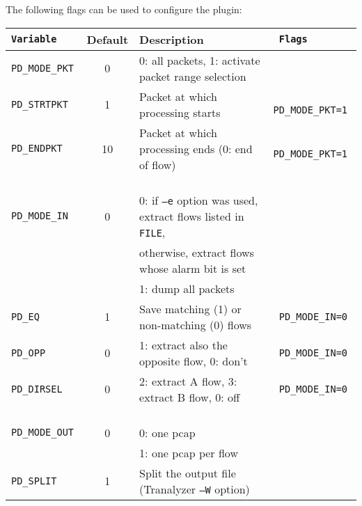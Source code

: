 \documentclass[documentation]{subfiles}
\begin{document}
The following flags can be used to configure the plugin:
\begin{longtable}{>{\tt}lcl>{\tt\small}l}
    \toprule
    {\bf Variable} & {\bf Default} & {\bf Description} & {\bf Flags}\\
    \midrule\endhead%
    PD\_MODE\_PKT & 0                  & 0: all packets, 1: activate packet range selection                               & \\
    PD\_STRTPKT   & 1                  & Packet at which processing starts                                                & PD\_MODE\_PKT=1 \\
    PD\_ENDPKT    & 10                 & Packet at which processing ends (0: end of flow)                                 & PD\_MODE\_PKT=1\\
                  &                    &                                                                                  & \\
    PD\_MODE\_IN  & 0                  & 0: if {\small\tt --e} option was used, extract flows listed in {\small\tt FILE}, & \\
                  &                    & \quad otherwise, extract flows whose alarm bit is set                            & \\
                  &                    & 1: dump all packets                                                              & \\
    PD\_EQ        & 1                  & Save matching (1) or non-matching (0) flows                                      & PD\_MODE\_IN=0\\
    PD\_OPP       & 0                  & 1: extract also the opposite flow, 0: don't                                      & PD\_MODE\_IN=0\\
    PD\_DIRSEL    & 0                  & 2: extract A flow, 3: extract B flow, 0: off                                     & PD\_MODE\_IN=0\\
                  &                    &                                                                                  & \\
    PD\_MODE\_OUT & 0                  & 0: one pcap                                                                      & \\
                  &                    & 1: one pcap per flow                                                             & \\
    PD\_SPLIT     & 1                  & Split the output file (Tranalyzer {\tt --W} option)                              & \\

\end{longtable}
\end{document}
